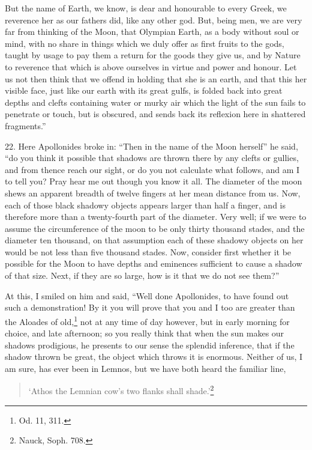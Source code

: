 \documentclass[a4paper, 11pt, oneside, polutonikogreek, english]{article}
\begin{document}
But the name of Earth, we know, is dear and honourable to every Greek, we reverence her as our fathers did, like any other god. But, being men, we are very far from thinking of the Moon, that Olympian Earth, as a body without soul or mind, with no share in things which we duly offer as first fruits to the gods, taught by usage to pay them a return for the goods they give us, and by Nature to reverence that which is above ourselves in virtue and power and honour. Let us not then think that we offend in holding that she is an earth, and that this her visible face, just like our earth with its great gulfs, is folded back into great depths and clefts containing water or murky air which the light of the sun fails to penetrate or touch, but is obscured, and sends back its reflexion here in shattered fragments.''

22. Here Apollonides broke in: ``Then in the name of the Moon herself'' he said, ``do you think it possible that shadows are thrown there by any clefts or gullies, and from thence reach our sight, or do you not calculate what follows, and am I to tell you? Pray hear me out though you know it all. The diameter of the moon shews an apparent breadth of twelve fingers at her mean distance from us. Now, each of those black shadowy objects appears larger than half a finger, and is therefore more than a twenty-fourth part of the diameter. Very well; if we were to assume the circumference of the moon to be only thirty thousand stades, and the diameter ten thousand, on that assumption each of these shadowy objects on her would be not less than five thousand stades. Now, consider first whether it be possible for the Moon to have depths and eminences sufficient to cause a shadow of that size. Next, if they are so large, how is it that we do not see them?''

At this, I smiled on him and said, ``Well done Apollonides, to have found out such a demonstration! By it you will prove that you and I too are greater than the Aloades of old,\footnote{Od. 11, 311.} not at any time of day however, but in early morning for choice, and late afternoon; so you really think that when the sun makes our shadows prodigious, he presents to our sense the splendid inference, that if the shadow thrown be great, the object which throws it is enormous. Neither of us, I am sure, has ever been in Lemnos, but we have both heard the familiar line,
\begin{quotation}
`Athos the Lemnian cow's two flanks shall shade.'\footnote{Nauck, Soph. 708.}
\end{quotation}
\end{document}
